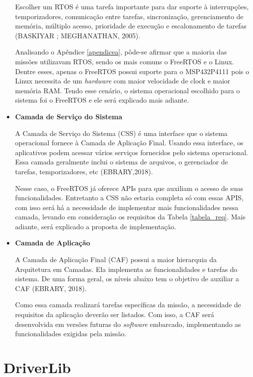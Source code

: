 \begin{itemize}
Escolher um RTOS é uma tarefa importante para dar suporte à interrupções, temporizadores, comunicação entre tarefas, sincronização, gerenciamento de memória, múltiplo acesso, prioridade de execução e escalonamento de tarefas (BASKIYAR ; MEGHANATHAN, 2005).

Analisando o Apêndice \ref{apendicea}, pôde-se afirmar que a maioria das missões utilizavam RTOS, sendo os mais comuns o FreeRTOS e o Linux. Dentre esses, apenas o FreeRTOS possui suporte para o MSP432P4111 pois o Linux necessita de um \textit{hardware} com maior velocidade de clock e maior memória RAM. Tendo esse cenário, o sistema operacional escolhido para o sistema foi o FreeRTOS e ele será explicado mais adiante. 

\item \textbf{Camada de Serviço do Sistema}

A Camada de Serviço do Sistema (CSS) é uma interface que o sistema operacional fornece à Camada de Aplicação Final. Usando essa interface, os aplicativos podem acessar vários serviços fornecidos pelo sistema operacional. Essa camada geralmente inclui o sistema de arquivos, o gerenciador de tarefas, temporizadores, etc (EBRARY,2018).

Nesse caso, o FreeRTOS já oferece APIs para que auxiliam o acesso de suas funcionalidades. Entretanto a CSS não estaria completa só com essas APIS, com isso será há a necessidade de implementar mais funcionalidades nessa camada, levando em consideração os requisitos da Tabela \ref{tabela_req}. Mais adiante, será explicado a proposta de implementação.


\item \textbf{Camada de Aplicação}

A Camada de Aplicação Final (CAF) possui a maior hierarquia da Arquitetura em Camadas. Ela implementa as funcionalidades e tarefas do sistema. De uma forma geral, os níveis abaixo tem o objetivo de auxiliar a CAF (EBRARY, 2018).

Como essa camada realizará tarefas específicas da missão, a necessidade de requisitos da aplicação deverão ser listados. Com isso, a CAF será desenvolvida em versões futuras do \textit{software} embarcado, implementando as funcionalidades exigidas pela missão.



\end{itemize}

\section{DriverLib}

